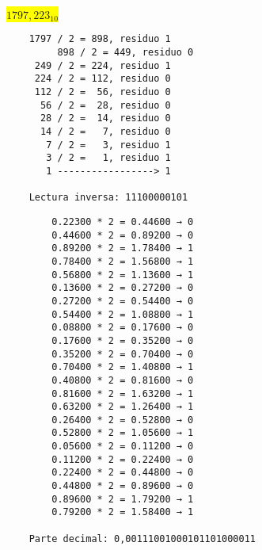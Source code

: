 \documentclass[a4paper,12pt]{article}
\begin{document}

\begin{center}
	\colorbox{yellow}{{$1797,223_{10}$}} \\ \vspace{0.3cm}
\end{center}	
\vspace{-1em}
\begin{minipage}[t]{0.40\textwidth}
	\hspace{2,5cm}
	
	\begin{Verbatim}
	1797 / 2 = 898, residuo 1
         898 / 2 = 449, residuo 0
	 249 / 2 = 224, residuo 1
	 224 / 2 = 112, residuo 0
	 112 / 2 =  56, residuo 0
	  56 / 2 =  28, residuo 0
	  28 / 2 =  14, residuo 0
	  14 / 2 =   7, residuo 0
	   7 / 2 =   3, residuo 1
	   3 / 2 =   1, residuo 1
	   1 -----------------> 1
		
	Lectura inversa: 11100000101
	\end{Verbatim}
	
\end{minipage}
\hfill
\begin{minipage}[t]{0.625\textwidth}
	\hspace{2cm}
	
	\begin{Verbatim}
		0.22300 * 2 = 0.44600 → 0 
		0.44600 * 2 = 0.89200 → 0 
		0.89200 * 2 = 1.78400 → 1  
		0.78400 * 2 = 1.56800 → 1 
		0.56800 * 2 = 1.13600 → 1 
		0.13600 * 2 = 0.27200 → 0 
		0.27200 * 2 = 0.54400 → 0 
		0.54400 * 2 = 1.08800 → 1 
		0.08800 * 2 = 0.17600 → 0 
		0.17600 * 2 = 0.35200 → 0 
		0.35200 * 2 = 0.70400 → 0 
		0.70400 * 2 = 1.40800 → 1 
		0.40800 * 2 = 0.81600 → 0 
		0.81600 * 2 = 1.63200 → 1 
		0.63200 * 2 = 1.26400 → 1 
		0.26400 * 2 = 0.52800 → 0 
		0.52800 * 2 = 1.05600 → 1 
		0.05600 * 2 = 0.11200 → 0 
		0.11200 * 2 = 0.22400 → 0 
		0.22400 * 2 = 0.44800 → 0 
		0.44800 * 2 = 0.89600 → 0 
		0.89600 * 2 = 1.79200 → 1 
		0.79200 * 2 = 1.58400 → 1 
		
	Parte decimal: 0,00111001000101101000011
	\end{Verbatim} 
	
\end{minipage}
\begin{center}
	\hspace{2cm}
\end{center}
\end{document}
